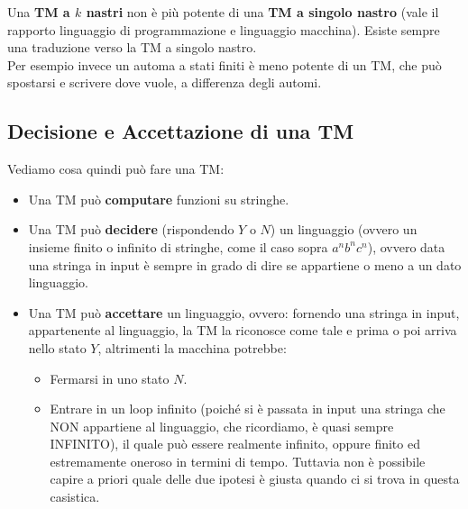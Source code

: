 Una \textbf{TM a $k$ nastri} non è più potente di una \textbf{TM a singolo
  nastro} (vale il rapporto linguaggio di programmazione e linguaggio
macchina). Esiste sempre una traduzione verso la TM a singolo nastro.\\
Per esempio invece un automa a stati finiti è meno potente di un TM, che può
spostarsi e scrivere dove vuole, a differenza degli automi.\\
\subsection{Decisione e Accettazione di una TM}
Vediamo cosa quindi può fare una TM:
\begin{itemize}
  \item Una TM può \textbf{computare} funzioni su stringhe.
  \item Una TM può \textbf{decidere} (rispondendo $Y$ o $N$) un linguaggio
  (ovvero un insieme finito o infinito di stringhe, come il caso sopra
  $a^nb^nc^n$), ovvero data una stringa in input è sempre in grado di dire se  appartiene o meno a un dato linguaggio.
  \item Una TM può \textbf{accettare} un linguaggio, ovvero: fornendo una stringa in input, appartenente al linguaggio, la TM la riconosce come tale e prima o poi arriva nello stato $Y$, altrimenti la macchina potrebbe:
  \begin{itemize}
    \item Fermarsi in uno stato $N$.
    \item Entrare in un loop infinito (poiché si è passata in input una stringa che NON appartiene al linguaggio, che ricordiamo, è quasi sempre INFINITO), il quale può essere realmente infinito, oppure finito ed estremamente oneroso in termini di tempo. Tuttavia non è possibile capire a priori quale delle due ipotesi è giusta quando ci si trova in questa casistica.
  \end{itemize}
\end{itemize}
